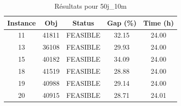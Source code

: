 
\begin{table}[h]
\centering
\begin{tabular}{|c|c|c|c|c|}
\hline
Instance & Obj & Status & Gap (\%) & Time (h) \\
\hline
11 & 41811 & FEASIBLE & 32.15 & 24.00 \\
13 & 36108 & FEASIBLE & 29.93 & 24.00 \\
15 & 40182 & FEASIBLE & 34.09 & 24.00 \\
18 & 41519 & FEASIBLE & 28.88 & 24.00 \\
19 & 40988 & FEASIBLE & 29.14 & 24.00 \\
20 & 40915 & FEASIBLE & 28.71 & 24.01 \\
\hline
\end{tabular}
\caption{Résultats pour 50j_10m}
\end{table}
